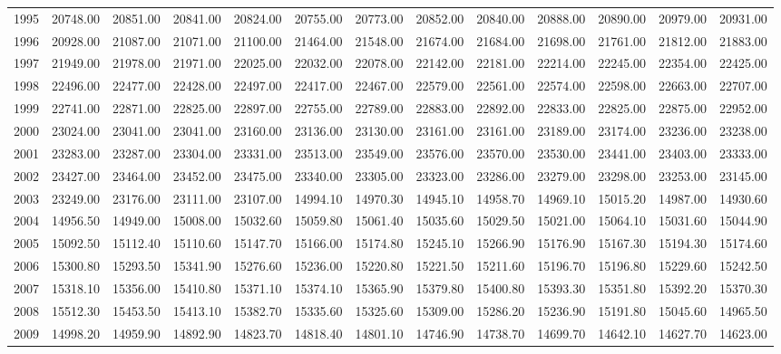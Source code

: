 \begin{longtable}{rrrrrrrrrrrrr}
  1995 & 20748.00 & 20851.00 & 20841.00 & 20824.00 & 20755.00 & 20773.00 & 20852.00 & 20840.00 & 20888.00 & 20890.00 & 20979.00 & 20931.00 \\ 
  1996 & 20928.00 & 21087.00 & 21071.00 & 21100.00 & 21464.00 & 21548.00 & 21674.00 & 21684.00 & 21698.00 & 21761.00 & 21812.00 & 21883.00 \\ 
  1997 & 21949.00 & 21978.00 & 21971.00 & 22025.00 & 22032.00 & 22078.00 & 22142.00 & 22181.00 & 22214.00 & 22245.00 & 22354.00 & 22425.00 \\ 
  1998 & 22496.00 & 22477.00 & 22428.00 & 22497.00 & 22417.00 & 22467.00 & 22579.00 & 22561.00 & 22574.00 & 22598.00 & 22663.00 & 22707.00 \\ 
  1999 & 22741.00 & 22871.00 & 22825.00 & 22897.00 & 22755.00 & 22789.00 & 22883.00 & 22892.00 & 22833.00 & 22825.00 & 22875.00 & 22952.00 \\ 
  2000 & 23024.00 & 23041.00 & 23041.00 & 23160.00 & 23136.00 & 23130.00 & 23161.00 & 23161.00 & 23189.00 & 23174.00 & 23236.00 & 23238.00 \\ 
  2001 & 23283.00 & 23287.00 & 23304.00 & 23331.00 & 23513.00 & 23549.00 & 23576.00 & 23570.00 & 23530.00 & 23441.00 & 23403.00 & 23333.00 \\ 
  2002 & 23427.00 & 23464.00 & 23452.00 & 23475.00 & 23340.00 & 23305.00 & 23323.00 & 23286.00 & 23279.00 & 23298.00 & 23253.00 & 23145.00 \\ 
  2003 & 23249.00 & 23176.00 & 23111.00 & 23107.00 & 14994.10 & 14970.30 & 14945.10 & 14958.70 & 14969.10 & 15015.20 & 14987.00 & 14930.60 \\ 
  2004 & 14956.50 & 14949.00 & 15008.00 & 15032.60 & 15059.80 & 15061.40 & 15035.60 & 15029.50 & 15021.00 & 15064.10 & 15031.60 & 15044.90 \\ 
  2005 & 15092.50 & 15112.40 & 15110.60 & 15147.70 & 15166.00 & 15174.80 & 15245.10 & 15266.90 & 15176.90 & 15167.30 & 15194.30 & 15174.60 \\ 
  2006 & 15300.80 & 15293.50 & 15341.90 & 15276.60 & 15236.00 & 15220.80 & 15221.50 & 15211.60 & 15196.70 & 15196.80 & 15229.60 & 15242.50 \\ 
  2007 & 15318.10 & 15356.00 & 15410.80 & 15371.10 & 15374.10 & 15365.90 & 15379.80 & 15400.80 & 15393.30 & 15351.80 & 15392.20 & 15370.30 \\ 
  2008 & 15512.30 & 15453.50 & 15413.10 & 15382.70 & 15335.60 & 15325.60 & 15309.00 & 15286.20 & 15236.90 & 15191.80 & 15045.60 & 14965.50 \\ 
  2009 & 14998.20 & 14959.90 & 14892.90 & 14823.70 & 14818.40 & 14801.10 & 14746.90 & 14738.70 & 14699.70 & 14642.10 & 14627.70 & 14623.00 \\ 

\end{longtable}
